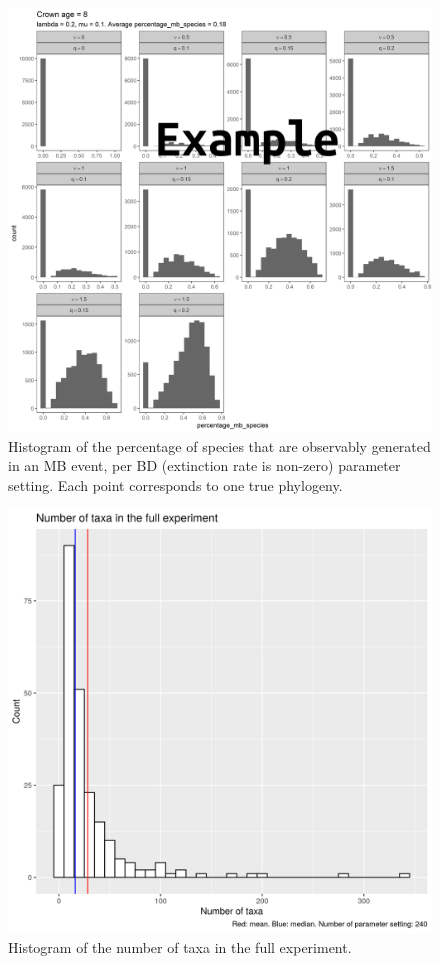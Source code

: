\begin{figure}[!htbp]
  \includegraphics[width=\textwidth]{p_mb_bd.png}
  \caption{
    Histogram of the percentage of species that are 
    observably generated in an MB event, per
    BD (extinction rate is non-zero) parameter setting.
    Each point corresponds to one true phylogeny.
  }
  \label{fig:mbness_per_bd_parameter_setting}
\end{figure}

\begin{figure}[!htbp]
  \includegraphics[width=\textwidth]{20190905_fig_n_taxa.png}
  \caption{
    Histogram of the number of taxa in the full experiment.
  }
  \label{fig:n_taxa}
\end{figure}

